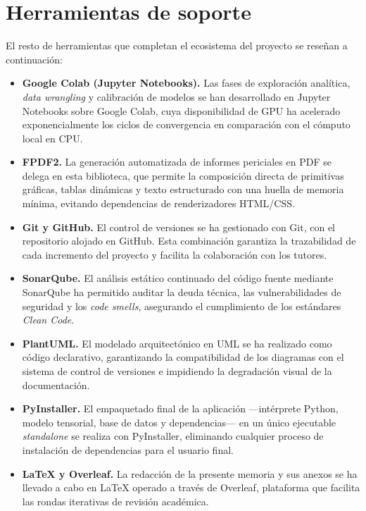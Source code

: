 \section{Herramientas de soporte}

El resto de herramientas que completan el ecosistema del proyecto se reseñan a continuación:

\begin{itemize}
    \item \textbf{Google Colab (Jupyter Notebooks).} Las fases de exploración analítica, \textit{data wrangling} y calibración de modelos se han desarrollado en Jupyter Notebooks sobre Google Colab, cuya disponibilidad de GPU ha acelerado exponencialmente los ciclos de convergencia en comparación con el cómputo local en CPU.

    \item \textbf{FPDF2.} La generación automatizada de informes periciales en PDF se delega en esta biblioteca, que permite la composición directa de primitivas gráficas, tablas dinámicas y texto estructurado con una huella de memoria mínima, evitando dependencias de renderizadores HTML/CSS.

    \item \textbf{Git y GitHub.} El control de versiones se ha gestionado con Git, con el repositorio alojado en GitHub. Esta combinación garantiza la trazabilidad de cada incremento del proyecto y facilita la colaboración con los tutores.

    \item \textbf{SonarQube.} El análisis estático continuado del código fuente mediante SonarQube ha permitido auditar la deuda técnica, las vulnerabilidades de seguridad y los \textit{code smells}, asegurando el cumplimiento de los estándares \textit{Clean Code}.

    \item \textbf{PlantUML.} El modelado arquitectónico en UML se ha realizado como código declarativo, garantizando la compatibilidad de los diagramas con el sistema de control de versiones e impidiendo la degradación visual de la documentación.

    \item \textbf{PyInstaller.} El empaquetado final de la aplicación —intérprete Python, modelo tensorial, base de datos y dependencias— en un único ejecutable \textit{standalone} se realiza con PyInstaller, eliminando cualquier proceso de instalación de dependencias para el usuario final.

    \item \textbf{LaTeX y Overleaf.} La redacción de la presente memoria y sus anexos se ha llevado a cabo en \LaTeX{} operado a través de Overleaf, plataforma que facilita las rondas iterativas de revisión académica.
\end{itemize}